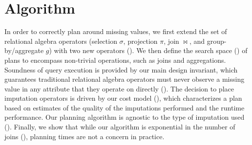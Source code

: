 \section{Algorithm}
\label{sec:algorithm}
In order to correctly plan around missing values, we first extend the set of relational algebra operators (selection $\sigma$, projection $\pi$, join $\bowtie$, and group-by/aggregate $g$) 
with two new operators (). We then define the search space () of plans to encompass non-trivial operations, such as joins and 
aggregations. Soundness of query execution is provided by our main design invariant, which guarantees traditional relational
algebra operators must never observe a missing value in any attribute that they operate on directly (). 
The decision to place imputation operators is driven by our cost model (), which characterizes a plan based on estimates of the 
quality of the imputations performed and the runtime performance. Our planning algorithm is
agnostic to the type of imputation used ().
Finally, we show that while our algorithm is exponential in the number of joins (), planning times are not a concern in practice.

\begin{table}
  \centering
  \captionsetup{labelfont=bf}
  \caption{}
\end{table}

